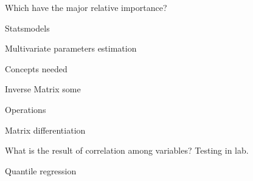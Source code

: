 \documentclass{beamer}
\begin{document}
\begin{frame}{Which have the major relative importance?}


\end{frame}




\begin{frame}{Statsmodels}

\end{frame}



\begin{frame}{Multivariate parameters estimation}

\end{frame}



\begin{frame}{Concepts needed}


\end{frame}

\begin{frame}{Inverse Matrix}
some
\end{frame}


\begin{frame}{Operations}

\end{frame}

\begin{frame}{Matrix differentiation}

\end{frame}





\begin{frame}{What is the result of correlation among variables?}
Testing in lab.

\end{frame}



\begin{frame}{Quantile regression}

\end{frame}
\end{document}

